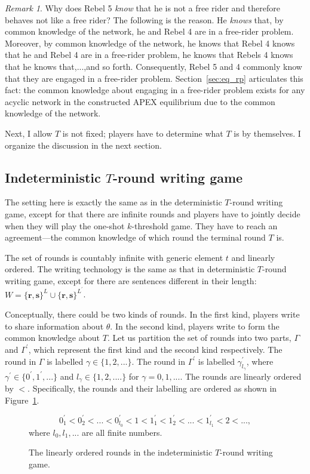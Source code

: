 \documentclass[12pt,letter]{article}
\theoremstyle{definition}
\theoremstyle{remark}
\newtheorem*{remark}{Remark}
\theoremstyle{claim}
\begin{document}
\begin{remark}
Why does Rebel 5 \textit{know} that he is not a free rider and therefore behaves not like a free rider? The following is the reason. He \textit{knows} that, by common knowledge of the network, he and Rebel 4 are in a free-rider problem. Moreover, by common knowledge of the network, he knows that Rebel 4 knows that he and Rebel 4 are in a free-rider problem, he knows that Rebels 4 knows that he knows that,...,and so forth. Consequently, Rebel 5 and 4 commonly know that they are engaged in a free-rider problem. Section~\ref{sec:eq_rp} articulates this fact: the common knowledge about engaging in a free-rider problem exists for any acyclic network in the constructed APEX equilibrium due to the common knowledge of the network.  
\end{remark}

Next, I allow $T$ is not fixed; players have to determine what $T$ is by themselves. I organize the discussion in the next section.

\subsection{Indeterministic $T$-round writing game}
\label{sec:indem_writing}
The setting here is exactly the same as in the deterministic $T$-round writing game, except for that there are infinite rounds and players have to jointly decide when they will play the one-shot $k$-threshold game. They have to {reach an agreement}---the common knowledge of which round the terminal round ${T}$ is. 

The set of rounds is countably infinite with generic element $t$ and linearly ordered. The writing technology is the same as that in deterministic $T$-round writing game, except for there are sentences different in their length: $W=\{\textbf{r},\textbf{s}\}^L\cup \{\textbf{r},\textbf{s}\}^{L^{'}}$. 

Conceptually, there could be two kinds of rounds. In the first kind, players write to share information about $\theta$. In the second kind, players write to form the common knowledge about ${T}$. Let us partition the set of rounds into two parts, $\Gamma$ and $\Gamma^{'}$, which represent the first kind and the second kind respectively. The round in $\Gamma$ is labelled $\gamma\in\{1,2,...\}$. The round in $\Gamma^{'}$ is labelled $\gamma^{'}_{l_\gamma}$, where $\gamma^{'}\in \{0^{'},1^{'},...\}$ and $l_{\gamma}\in\{1,2,....\}$ for $\gamma=0,1,...$. The rounds are linearly ordered by $<$. Specifically, the rounds and their labelling are ordered as shown in Figure~\ref{fig:ordered_writing}.
\begin{figure}
\begin{center}
\[0^{'}_1<0^{'}_2<...<0^{'}_{l_0}<1<1^{'}_{1}<1^{'}_{2}<...<1^{'}_{l_1}<2<...,\]
where $l_0,l_1,...$ are all finite numbers.
\caption{The linearly ordered rounds in the indeterministic $T$-round writing game.}
\label{fig:ordered_writing}
\end{center}
\end{figure}
\end{document}
